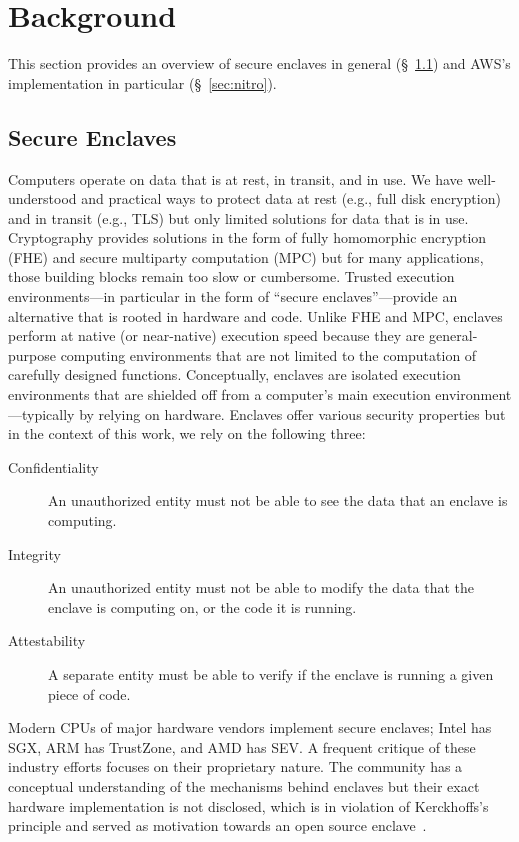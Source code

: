 \section{Background}
\label{sec:background}

This section provides an overview of secure enclaves in general
(\S~\ref{sec:enclaves}) and AWS's implementation in particular
(\S~\ref{sec:nitro}).

\subsection{Secure Enclaves}
\label{sec:enclaves}

Computers operate on data that is at rest, in transit, and in use.  We have
well-understood and practical ways to protect data at rest (e.g., full disk
encryption) and in transit (e.g., TLS) but only limited solutions for data that
is in use.  Cryptography provides solutions in the form of fully homomorphic
encryption (FHE) and secure multiparty computation (MPC) but for many
applications, those building blocks remain too slow or cumbersome.  Trusted
execution environments---in particular in the form of ``secure
enclaves''---provide an alternative that is rooted in hardware and code.
Unlike FHE and MPC, enclaves perform at native (or near-native) execution speed
because they are general-purpose computing environments that are not limited to
the computation of carefully designed functions.  Conceptually, enclaves are
isolated execution environments that are shielded off from a computer's main
execution environment---typically by relying on hardware.  Enclaves offer
various security properties but in the context of this work, we rely on the
following three:

\begin{description}
  \item[Confidentiality] An unauthorized entity must not be able to see the
    data that an enclave is computing.

  \item[Integrity] An unauthorized entity must not be able to modify the data
    that the enclave is computing on, or the code it is running.

  \item[Attestability] A separate entity must be able to verify if the enclave
    is running a given piece of code.
\end{description}

Modern CPUs of major hardware vendors implement secure enclaves; Intel has SGX,
ARM has TrustZone, and AMD has SEV.  A frequent critique of these industry
efforts focuses on their proprietary nature. The community has a conceptual
understanding of the mechanisms behind enclaves but their exact hardware
implementation is not disclosed, which is in violation of Kerckhoffs's
principle and served as motivation towards an open source
enclave~\cite{Lee20a}.

